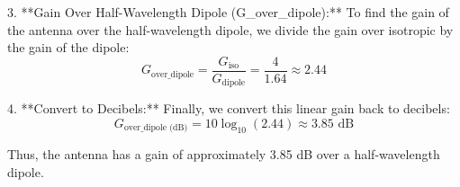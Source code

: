 3. **Gain Over Half-Wavelength Dipole (G\_over\_dipole):** To find the gain of the antenna over the half-wavelength dipole, we divide the gain over isotropic by the gain of the dipole:
   \[
   G_{\text{over\_dipole}} = \frac{G_{\text{iso}}}{G_{\text{dipole}}} = \frac{4}{1.64} \approx 2.44
   \]

4. **Convert to Decibels:** Finally, we convert this linear gain back to decibels:
   \[
   G_{\text{over\_dipole (dB)}} = 10 \log_{10}(2.44) \approx 3.85 \text{ dB}
   \]

Thus, the antenna has a gain of approximately 3.85 dB over a half-wavelength dipole.

